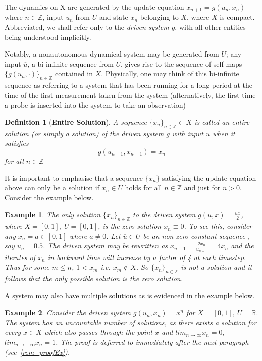 \documentclass[a4paper,12pt,twoside]{report}
\newtheorem{Definition}{Definition}[]
\newtheorem{Example}{Example}[]
\begin{document}
The dynamics on X are generated by the update equation $x_{n+1}=g(u_n, x_n)$ where $n\in\mathbb{Z}$, input $u_n$ from $U$ and state $x_n$ belonging to $X$, where $X$ is compact.
Abbreviated, we shall refer only to the \emph{driven system $g$}, with all other entities being understood implicitly.

Notably, a nonautonomous dynamical system may be generated from $U$; any input $\overline{u}$, a bi-infinite sequence from $U$, gives rise to the sequence of self-maps $\{g(u_n, \cdot)\}_{n\in\mathbb{Z}}$ contained in $X$.
Physically, one may think of this bi-infinite sequence as referring to a system that has been running for a long period at the time of the first measurement taken from the system (alternatively, the first time a probe is inserted into the system to take an observation)

\begin{Definition}
  [\bf Entire Solution] \label{Dfn_Soln} \rm
  A sequence $\{x_n\}_{n\in\mathbb{Z}}\subset X$ is called an entire solution (or simply a solution) of the driven system  $g$ with input $\overline{u}$ when it satisfies 
  \[g(u_{n-1}, x_{n-1})=x_n\] for all $n\in\mathbb{Z}$
\end{Definition}

It is important to emphasise that a sequence $\{x_n\}$ satisfying the update equation above can only be a solution if $x_n\in{U}$ holds for all $n\in\mathbb{Z}$ and just for $n>0$. Consider the example below.

\begin{Example} \rm \label{ex_halfux}
  The only solution  $\{x_n\}_{n\in\mathbb{Z}}$ to the driven system  $g(u,x)=\frac{ux}{2}$, where $X=[0,1]$, $U=[0,1]$,  is the zero solution $x_n\equiv0$.
  To see this, consider any $x_n=a\in[0,1]$ where $a\neq{0}$.  Let $\overline{u}\in{U}$ be an non-zero constant sequence , say $u_n=0.5$. 
  The driven system may be rewritten as $x_{n-1}=\frac{2x_n}{u_{n-1}}=4x_n$ and the  iterates of $x_n$ in backward time will increase by a factor of 4 at each timestep. 
  Thus for some $m\leq{n}$,  $1<x_m$ i.e. $x_m\notin{X}$. So ${\{x_n\}}_{n\in\mathbb{Z}}$ is not a solution and it follows that the only possible solution is the zero solution.
\end{Example}


A system may also have multiple solutions as is evidenced in the example below.

\begin{Example}\label{Ex_exp} \rm 
 Consider the driven system $g(u_n,x_n)=x^n$ for $X=[0,1]$, $U=\mathbb{R}$. The system has an uncountable number of solutions, as there exists a solution for every $x\in{X}$ which also passes through the point $x$ and $lim_{n\to\infty}x_n=0$, $lim_{n\to{-}\infty}x_n=1$. 
 The proof is deferred to immediately after the next paragraph (see~\ref{rem_proofEx}).
\end{Example}
\end{document}

